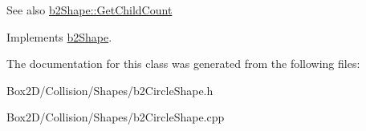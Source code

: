 \begin{DoxySeeAlso}{See also}
\hyperlink{classb2_shape_a05a3c445017d96df9238ceefe6ce37ab}{b2\+Shape\+::\+Get\+Child\+Count} 
\end{DoxySeeAlso}


Implements \hyperlink{classb2_shape_a05a3c445017d96df9238ceefe6ce37ab}{b2\+Shape}.



The documentation for this class was generated from the following files\+:\begin{DoxyCompactItemize}
\item 
Box2\+D/\+Collision/\+Shapes/b2\+Circle\+Shape.\+h\item 
Box2\+D/\+Collision/\+Shapes/b2\+Circle\+Shape.\+cpp\end{DoxyCompactItemize}
